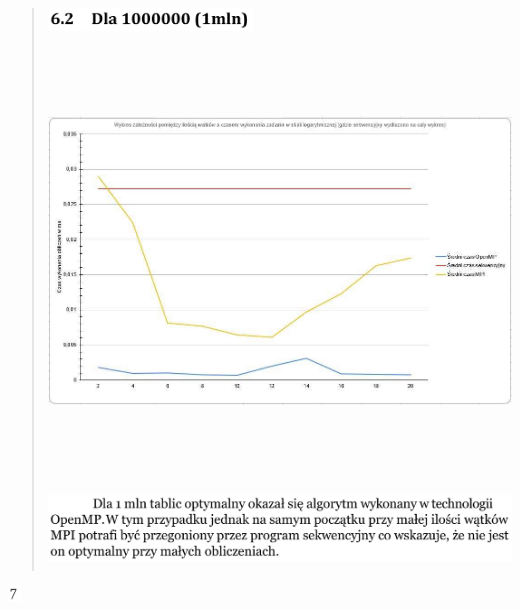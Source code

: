 \documentclass[
]{article}
\begin{document}
\begin{quote}
\includegraphics[width=2.13889in,height=0.23611in]{vertopal_45f5e71363bf454ba37a280ca069ec4b/media/image29.png}

\includegraphics[width=7.08194in,height=4.40278in]{vertopal_45f5e71363bf454ba37a280ca069ec4b/media/image30.png}

\includegraphics[width=5.48611in,height=0.79167in]{vertopal_45f5e71363bf454ba37a280ca069ec4b/media/image31.png}
\end{quote}

\includegraphics[width=0.13889in,height=0.18056in]{vertopal_45f5e71363bf454ba37a280ca069ec4b/media/image32.png}
\end{document}

